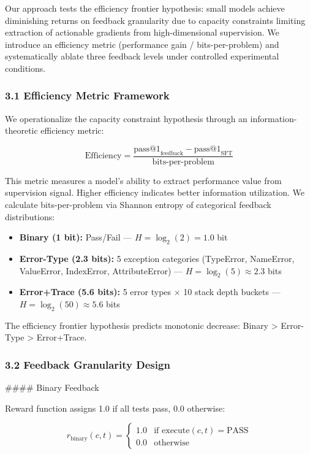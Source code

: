 
Our approach tests the efficiency frontier hypothesis: small models achieve diminishing returns on feedback granularity due to capacity constraints limiting extraction of actionable gradients from high-dimensional supervision. We introduce an efficiency metric (performance gain / bits-per-problem) and systematically ablate three feedback levels under controlled experimental conditions.

\subsubsection{3.1 Efficiency Metric Framework}

We operationalize the capacity constraint hypothesis through an information-theoretic efficiency metric:

$$\text{Efficiency} = \frac{\text{pass@1}_{\text{feedback}} - \text{pass@1}_{\text{SFT}}}{\text{bits-per-problem}}$$

This metric measures a model's ability to extract performance value from supervision signal. Higher efficiency indicates better information utilization. We calculate bits-per-problem via Shannon entropy of categorical feedback distributions:

\begin{itemize}
\item \textbf{Binary (1 bit):} Pass/Fail --- $H = \log_2(2) = 1.0$ bit
\item \textbf{Error-Type (2.3 bits):} 5 exception categories (TypeError, NameError, ValueError, IndexError, AttributeError) --- $H = \log_2(5) \approx 2.3$ bits
\item \textbf{Error+Trace (5.6 bits):} 5 error types $\times$ 10 stack depth buckets --- $H = \log_2(50) \approx 5.6$ bits
\end{itemize}

The efficiency frontier hypothesis predicts monotonic decrease: Binary > Error-Type > Error+Trace.

\subsubsection{3.2 Feedback Granularity Design}

\#\#\#\# Binary Feedback

Reward function assigns 1.0 if all tests pass, 0.0 otherwise:

$$r_{\text{binary}}(c, t) = \begin{cases} 1.0 & \text{if } \text{execute}(c, t) = \text{PASS} \\ 0.0 & \text{otherwise} \end{cases}$$

